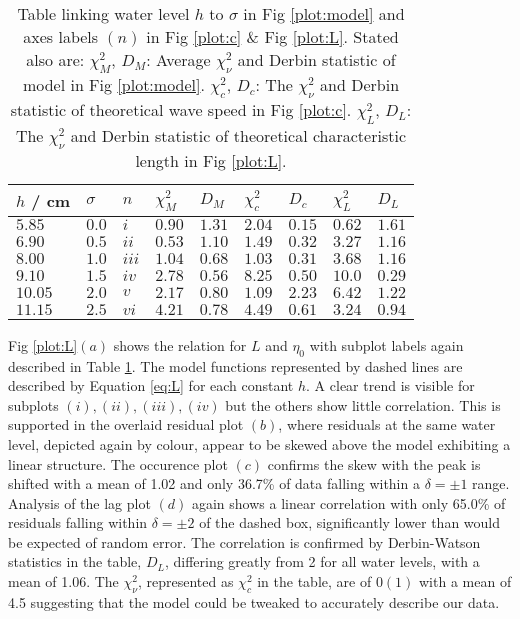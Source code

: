 \documentclass[10pt, twocolumn]{revtex4}    %
\begin{document}
\begin{table}[!h]
\centering
\begin{tabularx}{\columnwidth}{ X  X  X  X  X  X  X  X  X }
  \hline
  $h$ / cm & $\sigma$ & $n$ & $\chi^2_M$ & $D_M$ & $\chi^2_c $ & $D_c$ & $\chi^2_L$ & $D_L$ \\
  \hline\hline
  $5.85$  & $0.0$ & $ i $   & $0.90$ & $1.31$ & $2.04$ & $0.15$ & $0.62$ & $1.61$ \\
  $6.90$  & $0.5$ & $ ii $  & $0.53$ & $1.10$ & $1.49$ & $0.32$ & $3.27$ & $1.16$ \\
  $8.00$  & $1.0$ & $ iii $ & $1.04$ & $0.68$ & $1.03$ & $0.31$ & $3.68$ & $1.16$ \\
  $9.10$  & $1.5$ & $ iv $  & $2.78$ & $0.56$ & $8.25$ & $0.50$ & $10.0$ & $0.29$ \\
  $10.05$ & $2.0$ & $ v $   & $2.17$ & $0.80$ & $1.09$ & $2.23$ & $6.42$ & $1.22$ \\
  $11.15$ & $2.5$ & $ vi $  & $4.21$ & $0.78$ & $4.49$ & $0.61$ & $3.24$ & $0.94$ \\
  \hline
\end{tabularx}
\caption{
Table linking water level $h$ to $\sigma$ in Fig \ref{plot:model} and axes labels $(n)$ in Fig \ref{plot:c} \& Fig \ref{plot:L}. Stated also are:
$\chi^2_M$, $D_M$: Average $\chi^2_\nu$ and Derbin statistic of model in Fig \ref{plot:model}.
$\chi^2_c$, $D_c$: The $\chi^2_\nu$ and Derbin statistic of theoretical wave speed in Fig \ref{plot:c}.
$\chi^2_L$, $D_L$: The $\chi^2_\nu$ and Derbin statistic of theoretical characteristic length in Fig \ref{plot:L}.
}
\label{table:data}
\end{table}

Fig \ref{plot:L}$(a)$ shows the relation for $L$ and $\eta_0$ with subplot labels again described in Table \ref{table:data}.
The model functions represented by dashed lines are described by Equation \ref{eq:L} for each constant $h$.
A clear trend is visible for subplots $(i), (ii), (iii), (iv)$ but the others show little correlation.
This is supported in the overlaid residual plot $(b)$, where residuals at the same water level, depicted again by colour, appear to be skewed above the model exhibiting a linear structure.
The occurence plot $(c)$ confirms the skew with the peak is shifted with a mean of 1.02 and only 36.7\% of data falling within a $\delta = \pm 1$ range.
Analysis of the lag plot $(d)$ again shows a linear correlation with only 65.0\% of residuals falling within $\delta = \pm 2$ of the dashed box, significantly lower than would be expected of random error.
The correlation is confirmed by Derbin-Watson statistics in the table, $D_L$, differing greatly from 2 for all water levels, with a mean of 1.06.
The $\chi^2_\nu$, represented as $\chi^2_c$ in the table, are of $\mathcal{0}(1)$ with a mean of 4.5 suggesting that the model could be tweaked to accurately describe our data.
\end{document}
